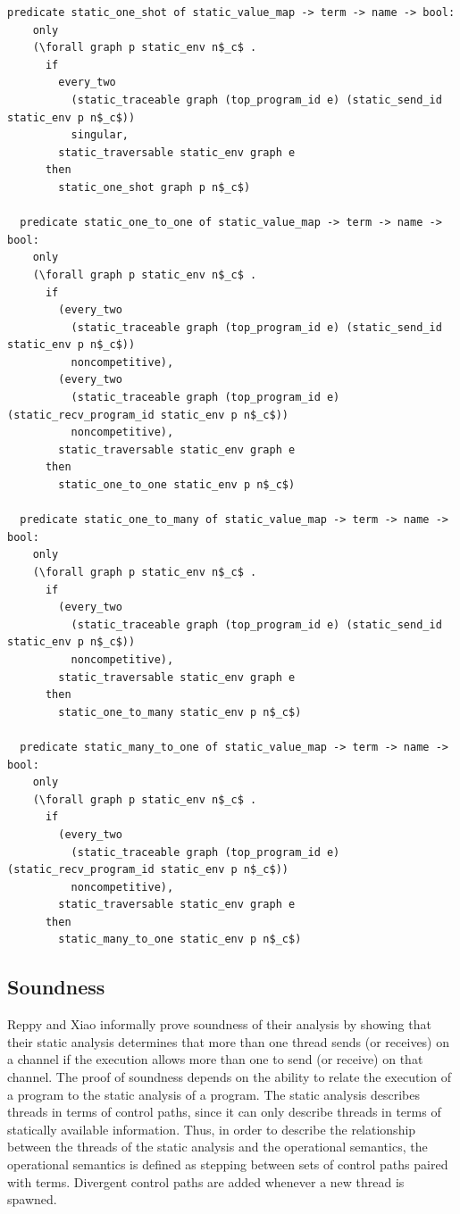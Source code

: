 \documentclass[10pt]{article}
\begin{document}
\begin{lstlisting}[language=logic, mathescape]
  predicate static_one_shot of static_value_map -> term -> name -> bool:
    only
    (\forall graph p static_env n$_c$ .
      if
        every_two
          (static_traceable graph (top_program_id e) (static_send_id static_env p n$_c$))
          singular,
        static_traversable static_env graph e
      then
        static_one_shot graph p n$_c$)

  predicate static_one_to_one of static_value_map -> term -> name -> bool:
    only
    (\forall graph p static_env n$_c$ .
      if
        (every_two
          (static_traceable graph (top_program_id e) (static_send_id static_env p n$_c$))
          noncompetitive), 
        (every_two
          (static_traceable graph (top_program_id e) (static_recv_program_id static_env p n$_c$))
          noncompetitive), 
        static_traversable static_env graph e
      then
        static_one_to_one static_env p n$_c$)

  predicate static_one_to_many of static_value_map -> term -> name -> bool:
    only
    (\forall graph p static_env n$_c$ .
      if
        (every_two
          (static_traceable graph (top_program_id e) (static_send_id static_env p n$_c$))
          noncompetitive),
        static_traversable static_env graph e
      then
        static_one_to_many static_env p n$_c$) 

  predicate static_many_to_one of static_value_map -> term -> name -> bool:
    only
    (\forall graph p static_env n$_c$ .
      if
        (every_two
          (static_traceable graph (top_program_id e) (static_recv_program_id static_env p n$_c$))
          noncompetitive),
        static_traversable static_env graph e
      then
        static_many_to_one static_env p n$_c$) 
\end{lstlisting}

\subsection{Soundness}

Reppy and Xiao informally prove soundness of their analysis by showing that their static analysis
determines that more than one thread sends (or receives) on a channel if the execution allows more
than one to send (or receive) on that channel. The proof of soundness depends on the
ability to relate the execution of a program to the static analysis of a program. The static
analysis describes threads in terms of control paths, since it can only describe threads in
terms of statically available information. Thus, in order to describe the relationship between
the threads of the static analysis and the operational semantics, the operational semantics is
defined as stepping between sets of control paths paired with terms. Divergent control paths
are added whenever a new thread is spawned.
\end{document}
